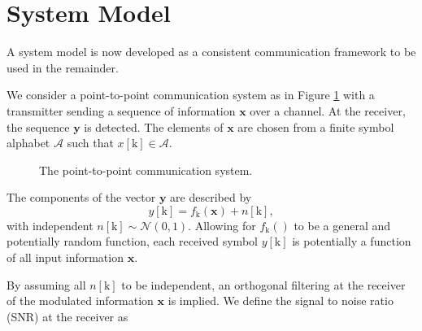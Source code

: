 \par

\section{System Model}

A system model is now developed as a consistent communication framework to be used in the remainder.
\par
We consider a point-to-point communication system as in Figure \ref{fig:model} with a transmitter sending a sequence of information $\mathbf{x}$ over a channel. At the receiver, the sequence  $\mathbf{y}$ is detected. 
The elements of $\mathbf{x}$ are chosen from a finite symbol alphabet $\mathcal{A}$ such that $x[\text{k}] \in \mathcal{A}$.

\begin{figure}[H]
\caption{The point-to-point communication system.}
\label{fig:model}
\end{figure}

The components of the vector $\mathbf{y}$ are described by 
\begin{equation*}
y[\text{k}] = f_{\text{k}}(\mathbf{x}) + n[\text{k}],
\end{equation*}
with independent $n[\text{k}]\sim \mathcal{N}(0,1).$
Allowing for $f_{\text{k}}()$ to be a general and potentially random function, each received symbol $y[\text{k}]$ is potentially a function of all input information $\mathbf{x}$.

By assuming all $n[\text{k}]$ to be independent, an orthogonal filtering at the receiver of the modulated information $\mathbf{x}$ is implied. We define the signal to noise ratio (SNR) at the receiver as 

